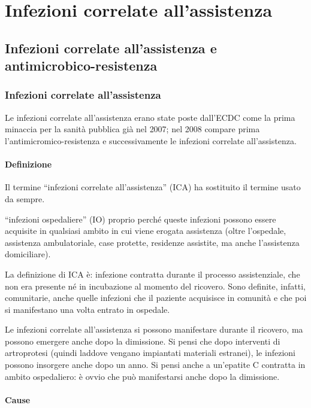 \section{Infezioni correlate all'assistenza}

\subsection{Infezioni correlate all'assistenza e antimicrobico-resistenza}

\subsubsection{Infezioni correlate all'assistenza}

Le infezioni correlate all'assistenza erano state poste dall'ECDC come la prima minaccia per la sanità pubblica già nel 2007; nel 2008 compare prima l'antimicromico-resistenza e successivamente le infezioni correlate all'assistenza.

\paragraph{Definizione}

Il termine ``infezioni correlate all'assistenza'' (ICA) ha sostituito il termine usato da sempre.

``infezioni ospedaliere'' (IO) proprio perché queste infezioni possono essere acquisite in qualsiasi ambito in cui viene erogata assistenza (oltre l'ospedale, assistenza ambulatoriale, case protette, residenze assistite, ma anche l'assistenza domiciliare).

La definizione di ICA è: infezione contratta durante il processo
assistenziale, che non era presente né in incubazione al momento del
ricovero. Sono definite, infatti, comunitarie, anche quelle infezioni
che il paziente acquisisce in comunità e che poi si manifestano una
volta entrato in ospedale.

Le infezioni correlate all'assistenza si possono manifestare durante il
ricovero, ma possono emergere anche dopo la dimissione. Si pensi che
dopo interventi di artroprotesi (quindi laddove vengano impiantati
materiali estranei), le infezioni possono insorgere anche dopo un anno.
Si pensi anche a un'epatite C contratta in ambito ospedaliero: è ovvio
che può manifestarsi anche dopo la dimissione.

\paragraph{Cause}

